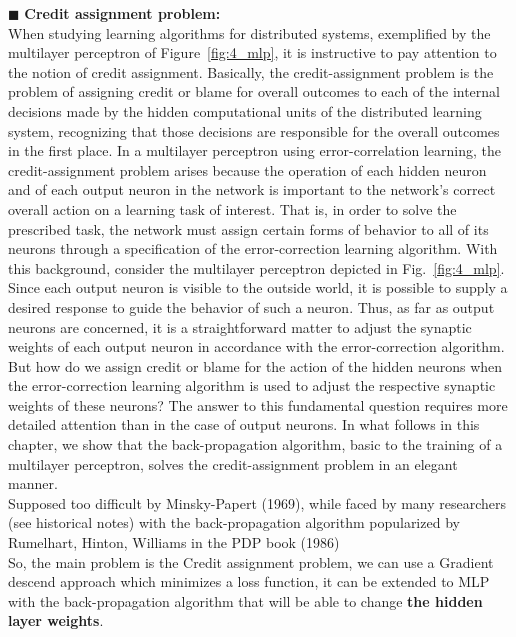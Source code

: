 \documentclass[../main.tex]{subfiles}
\begin{document}
\noindent$\blacksquare$ \textbf{Credit assignment problem:}\\
When studying learning algorithms for distributed systems, exemplified by the multilayer perceptron of Figure~\ref{fig:4_mlp}, it is instructive to pay attention to the notion of credit assignment. Basically, the credit-assignment problem is the problem of assigning credit or blame for overall outcomes to each of the internal decisions made by the hidden computational units of the distributed learning system, recognizing that those decisions are responsible for the overall outcomes in the first place.
In a multilayer perceptron using error-correlation learning, the credit-assignment problem arises because the operation of each hidden neuron and of each output neuron in the network is important to the network’s correct overall action on a learning task of interest. That is, in order to solve the prescribed task, the network must assign certain forms of behavior to all of its neurons through a specification of the error-correction learning algorithm. With this background, consider the multilayer perceptron depicted in Fig.~\ref{fig:4_mlp}. Since each output neuron is visible to the outside world, it is possible to supply a desired response to guide the behavior of such a neuron. Thus, as far as output neurons are concerned, it is a straightforward matter to adjust the synaptic weights of each output neuron in accordance with the error-correction algorithm. But how do we assign credit or blame for the action of the hidden neurons when the error-correction learning algorithm is used to adjust the respective synaptic weights of these neurons? The answer to this fundamental question requires more detailed attention than in the case of output neurons.
In what follows in this chapter, we show that the back-propagation algorithm, basic to the training of a multilayer perceptron, solves the credit-assignment problem in an elegant manner.\\
Supposed too difficult by Minsky-Papert (1969), while faced by many researchers (see historical notes) with the back-propagation algorithm popularized by Rumelhart, Hinton, Williams in the PDP book (1986)\\


So, the main problem is the Credit assignment problem, we can use a Gradient descend approach which minimizes a loss function, it can be extended to MLP with the back-propagation algorithm that will be able to change \textbf{the hidden layer weights}.\\
\end{document}
